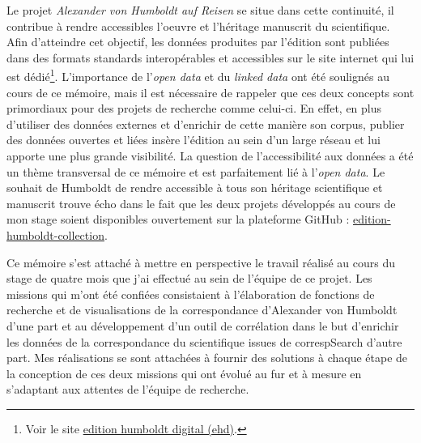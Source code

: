 \documentclass[a4paper, 12pt, twoside]{book}
\begin{document}
Le projet \textit{Alexander von Humboldt auf Reisen} se situe dans cette continuité, il contribue à rendre accessibles l'oeuvre et l'héritage manuscrit du scientifique. Afin d'atteindre cet objectif, les données produites par l'édition sont publiées dans des formats standards interopérables et accessibles sur le site internet qui lui est dédié\footnote{Voir le site \href{https://edition-humboldt.de/}{edition humboldt digital (ehd)}.}. L'importance de l'\textit{open data} et du \textit{linked data} ont été soulignés au cours de ce mémoire, mais il est nécessaire de rappeler que ces deux concepts sont primordiaux pour des projets de recherche comme celui-ci. En effet, en plus d'utiliser des données externes et d'enrichir de cette manière son corpus, publier des données ouvertes et liées insère l'édition au sein d'un large réseau et lui apporte une plus grande visibilité. La question de l'accessibilité aux données a été un thème transversal de ce mémoire et est parfaitement lié à l'\textit{open data}. Le souhait de Humboldt de rendre accessible à tous son héritage scientifique et manuscrit trouve écho dans le fait que les deux projets développés au cours de mon stage soient disponibles ouvertement sur la plateforme GitHub : \href{https://github.com/edition-humboldt-collection}{edition-humboldt-collection}. 

Ce mémoire s'est attaché à mettre en perspective le travail réalisé au cours du stage de quatre mois que j'ai effectué au sein de l'équipe de ce projet. Les missions qui m'ont été confiées consistaient à l'élaboration de fonctions de recherche et de visualisations de la correspondance d'Alexander von Humboldt d'une part et au développement d'un outil de corrélation dans le but d'enrichir les données de la correspondance du scientifique issues de correspSearch d'autre part. Mes réalisations se sont attachées à fournir des solutions à chaque étape de la conception de ces deux missions qui ont évolué au fur et à mesure en s'adaptant aux attentes de l'équipe de recherche.
\end{document}
